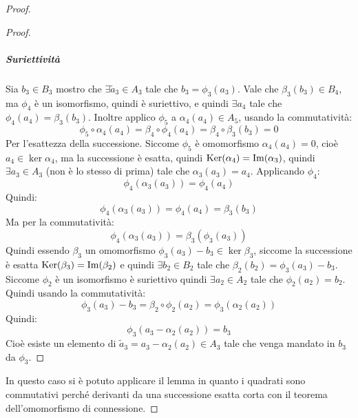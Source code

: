\begin{proof}
\begin{proof}
    \subparagraph{Suriettività} Sia $ b_3 \in B_3 $ mostro che
    $ \exists \tilde{a}_3 \in A_3 $ tale che $ b_3 = \phi_3(a_3) $. Vale che
    $ \beta_3(b_3) \in B_4 $, ma $ \phi_4 $ è un isomorfismo, quindi è suriettivo, e
    quindi $ \exists a_4 $ tale che $ \phi_4(a_4) = \beta_3(b_3) $. Inoltre applico $ \phi_5 $
    a $ \alpha_4(a_4) \in A_5 $, usando la commutatività:
    \[
      \phi_5 \circ \alpha_4 (a_4) = \beta_4 \circ \phi_4 (a_4) = \beta_4 \circ \beta_3 (b_3) = 0
    \]
    Per l'esattezza della successione.
    Siccome $ \phi_5 $ è omomorfismo $ \alpha_4(a_4) = 0 $, cioè $ a_4 \in \ker{\alpha_4} $,
    ma la successione è esatta, quindi $ \mathrm{Ker}( \alpha_4) = \mathrm{Im}( \alpha_3 ) $, quindi
    $ \exists a_3 \in A_3 $ (non è lo stesso di prima) tale che $ \alpha_3(a_3) = a_4 $.
    Applicando $ \phi_4 $:
    \[
      \phi_4 (\alpha_3(a_3)) = \phi_4(a_4)
    \]
    Quindi:
    \[
      \phi_4 (\alpha_3(a_3)) = \phi_4(a_4) = \beta_3(b_3)
    \]
    Ma per la commutatività:
    \[
      \phi_4 (\alpha_3(a_3)) = \beta_3(\phi_3(a_3))
    \]
    Quindi essendo $ \beta_3 $ un omomorfismo $ \phi_3(a_3) - b_3 \in \ker{\beta_3} $,
    siccome la successione è esatta $ \mathrm{Ker}( \beta_3) = \mathrm{Im}( \beta_2 ) $ e quindi
    $ \exists b_2 \in B_2 $ tale che $ \beta_2(b_2) = \phi_3(a_3) - b_3 $. Siccome $ \phi_2 $
    è un isomorfismo è suriettivo quindi $ \exists a_2 \in A_2 $ tale che $ \phi_2(a_2) = b_2 $.
    Quindi usando la commutatività:
    \[
      \phi_3(a_3) - b_3 = \beta_2 \circ \phi_2 (a_2) = \phi_3(\alpha_2(a_2))
    \]
    Quindi:
    \[
      \phi_3(a_3 - \alpha_2(a_2)) = b_3
    \]
    Cioè esiste un elemento di $ \tilde{a}_3 = a_3 - \alpha_2(a_2) \in A_3 $ tale che
    venga mandato in $ b_3 $ da $ \phi_3 $.
  \end{proof}
  In questo caso si è potuto applicare il lemma in quanto i quadrati sono commutativi
  perché derivanti da una successione esatta corta con il teorema dell'omomorfismo
  di connessione.
\end{proof}
\eproof


